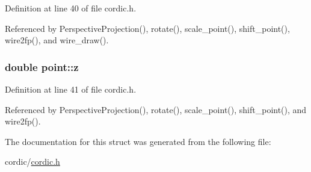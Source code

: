 Definition at line 40 of file cordic.\+h.



Referenced by Perspective\+Projection(), rotate(), scale\+\_\+point(), shift\+\_\+point(), wire2fp(), and wire\+\_\+draw().

\subsubsection[{\texorpdfstring{z}{z}}]{\setlength{\rightskip}{0pt plus 5cm}double point\+::z}\hypertarget{structpoint_aab1f0c3682401083b5bf252e7001874f}{}\label{structpoint_aab1f0c3682401083b5bf252e7001874f}


Definition at line 41 of file cordic.\+h.



Referenced by Perspective\+Projection(), rotate(), scale\+\_\+point(), shift\+\_\+point(), and wire2fp().



The documentation for this struct was generated from the following file\+:\begin{DoxyCompactItemize}
\item 
cordic/\hyperlink{cordic_8h}{cordic.\+h}\end{DoxyCompactItemize}
